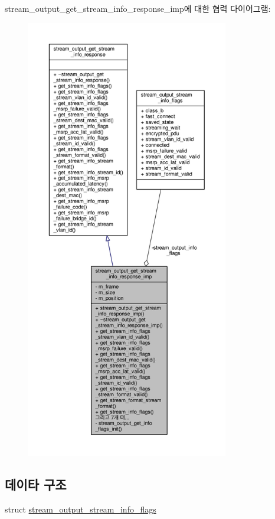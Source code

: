 stream\+\_\+output\+\_\+get\+\_\+stream\+\_\+info\+\_\+response\+\_\+imp에 대한 협력 다이어그램\+:
\nopagebreak
\begin{figure}[H]
\begin{center}
\leavevmode
\includegraphics[height=550pt]{classavdecc__lib_1_1stream__output__get__stream__info__response__imp__coll__graph}
\end{center}
\end{figure}
\subsection*{데이타 구조}
\begin{DoxyCompactItemize}
\item 
struct \hyperlink{structavdecc__lib_1_1stream__output__get__stream__info__response__imp_1_1stream__output__stream__info__flags}{stream\+\_\+output\+\_\+stream\+\_\+info\+\_\+flags}
\end{DoxyCompactItemize}
